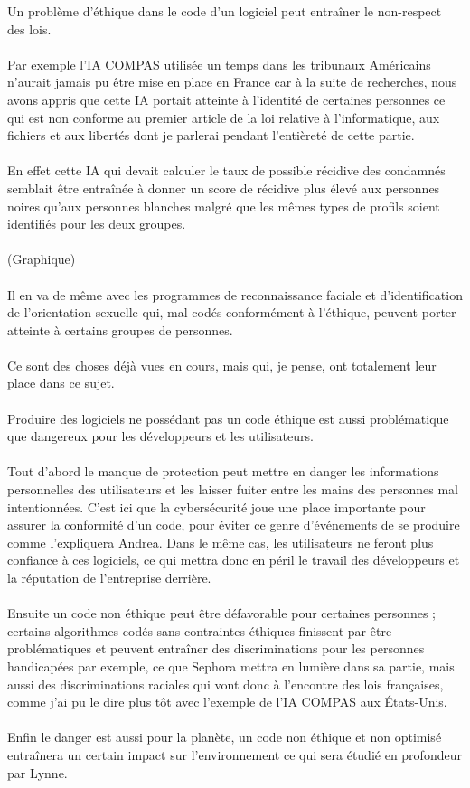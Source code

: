 \documentclass{article}
\begin{document}
Un problème d'éthique dans le code d'un logiciel peut entraîner le non-respect des lois.\\
\\Par exemple l'IA COMPAS utilisée un temps dans les tribunaux Américains n'aurait jamais pu être mise en place en France car à la suite de recherches, nous avons appris que cette IA portait atteinte à l'identité de certaines personnes ce qui est non conforme au premier article de la loi relative à l'informatique, aux fichiers et aux libertés dont je parlerai pendant l'entièreté de cette partie.\\
\\En effet cette IA qui devait calculer le taux de possible récidive des condamnés semblait être entraînée à donner un score de récidive plus élevé aux personnes noires qu’aux personnes blanches malgré que les mêmes types de profils soient identifiés pour les deux groupes.\\
\\
(Graphique)
\\
\\Il en va de même avec les programmes de reconnaissance faciale et d'identification de l'orientation sexuelle qui, mal codés conformément à l'éthique, peuvent porter atteinte à certains groupes de personnes.\\
\\Ce sont des choses déjà vues en cours, mais qui, je pense, ont totalement leur place dans ce sujet.\\
\\Produire des logiciels ne possédant pas un code éthique est aussi problématique que dangereux pour les développeurs et les utilisateurs.\\
\\Tout d'abord le manque de protection peut mettre en danger les informations personnelles des utilisateurs et les laisser fuiter entre les mains des personnes mal intentionnées. C'est ici que la cybersécurité joue une place importante pour assurer la conformité d'un code, pour éviter ce genre d'événements de se produire comme l'expliquera Andrea. Dans le même cas, les utilisateurs ne feront plus confiance à ces logiciels, ce qui mettra donc en péril le travail des développeurs et la réputation de l'entreprise derrière.\\
\\Ensuite un code non éthique peut être défavorable pour certaines personnes ; certains algorithmes codés sans contraintes éthiques finissent par être problématiques et peuvent entraîner des discriminations pour les personnes handicapées par exemple, ce que Sephora mettra en lumière dans sa partie, mais aussi des discriminations raciales qui vont donc à l'encontre des lois françaises, comme j'ai pu le dire plus tôt avec l'exemple de l'IA COMPAS aux États-Unis.\\
\\Enfin le danger est aussi pour la planète, un code non éthique et non optimisé entraînera un certain impact sur l'environnement ce qui sera étudié en profondeur par Lynne.\\
\end{document}
